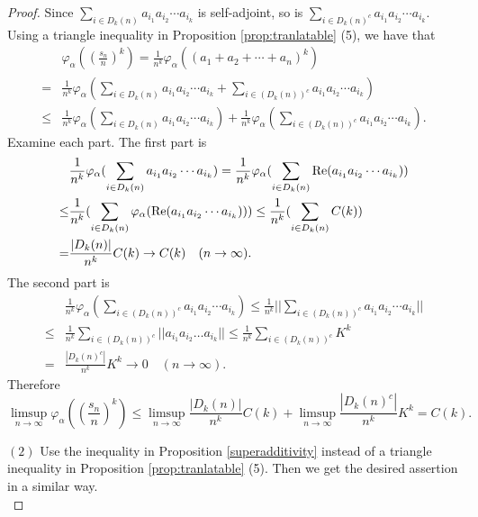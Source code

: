 \documentclass[a4paper,12pt]{amsart}
\begin{document}
\begin{proof}
Since $\sum_{i \in D_k(n)} a_{i_1}a_{i_2}\cdots a_{i_k}$ is self-adjoint, so is
$\sum_{i \in D_k(n)^c} a_{i_1}a_{i_2}\cdots a_{i_k}$.
Using a triangle inequality in Proposition \ref{prop:tranlatable} (5), we have that
\begin{align*}
     & \varphi_{\alpha}((\frac{s_n}{n})^k) = \frac{1}{n^k}  \varphi_{\alpha}((a_1 + a_2 + \cdots + a_n)^k)  \\
  = & \frac{1}{n^k}  \varphi_{\alpha}( \sum_{i \in D_k(n)} a_{i_1}a_{i_2} \cdots a_{i_k} 
         +  \sum_{i \in (D_k(n))^c} a_{i_1}a_{i_2} \cdots a_{i_k} )  \\
  \leq &  \frac{1}{n^k}  \varphi_{\alpha}( \sum_{i \in D_k(n)} a_{i_1}a_{i_2} \cdots a_{i_k} )
         +  \frac{1}{n^k} \varphi_{\alpha} (\sum_{i \in (D_k(n))^c} a_{i_1}a_{i_2} \cdots a_{i_k} ).
\end{align*}
Examine each part.  The first part is 
\begin{align*}
& \frac{1}{n^k}  \varphi_{\alpha}( \sum_{i \in D_k(n)} a_{i_1}a_{i_2} \cdots a_{i_k} ) 
= \frac{1}{n^k}  \varphi_{\alpha}( \sum_{i \in D_k(n)} {\rm Re} (a_{i_1}a_{i_2} \cdots a_{i_k}) ) \\
\leq &  \frac{1}{n^k}  ( \sum_{i \in D_k(n)} \varphi_{\alpha}({\rm Re}(a_{i_1}a_{i_2} \cdots a_{i_k}) ))
  \leq  \frac{1}{n^k}  ( \sum_{i \in D_k(n)} C(k) ) \\
= & \frac{|D_k(n)|}{n^k} C(k) \to C(k) \quad (n\to \infty).
\end{align*}
The second part is 
\begin{align*} 
  &  \frac{1}{n^k} \varphi_{\alpha} (\sum_{i \in (D_k(n))^c} a_{i_1}a_{i_2} \cdots a_{i_k} ) 
      \leq \frac{1}{n^k}  ||\sum_{i \in (D_k(n))^c} a_{i_1}a_{i_2} \cdots a_{i_k} || \\
 \leq & \frac{1}{n^k}  \sum_{i \in (D_k(n))^c} ||a_{i_1}a_{i_2} \dots a_{i_k} || 
      \leq  \frac{1}{n^k}  \sum_{i \in (D_k(n))^c} K^k \\
   = &  \frac{|D_k(n)^c|}{n^k} K^k \to 0 \quad (n \to \infty).
\end{align*} 
Therefore 
\[   \limsup _{n \to \infty}  \varphi_{\alpha}((\frac{s_n}{n})^k) 
     \leq \limsup _{n \to \infty} \frac{|D_k(n)|}{n^k}C(k)    
           + \limsup _{n \to \infty} \frac{|D_k(n)^c|}{n^k}K^k = C(k).  
\]

$(2)$  Use the inequality in Proposition \ref{superadditivity} instead of a triangle inequality in Proposition \ref{prop:tranlatable} (5). Then we get the desired assertion in a similar way.  \\
\end{proof}
\end{document}
